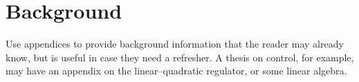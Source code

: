 \chapter{Background}

Use appendices to provide background information that the reader may already know, but is useful in case they need a refresher. A thesis on control, for example, may have an appendix on the linear--quadratic regulator, or some linear algebra.